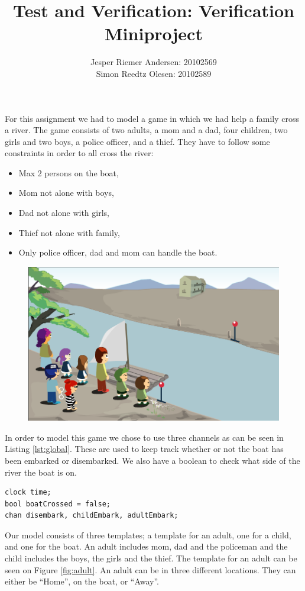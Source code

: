\documentclass[a4paper,12pt]{article}
\title{Test and Verification: Verification Miniproject}
\author{Jesper Riemer Andersen: 20102569\\Simon Reedtz Olesen: 20102589}
\begin{document}
\maketitle

For this assignment we had to model a game in which we had help a family cross a river. The game consists of two adults, a mom and a dad, four children, two girls and two boys, a police officer, and a thief. They have to follow some constraints in order to all cross the river:

\begin{itemize}[noitemsep]
\item Max 2 persons on the boat,
\item Mom not alone with boys,
\item Dad not alone with girls,
\item Thief not alone with family,
\item Only police officer, dad and mom can handle the boat.
\end{itemize}


\begin{figure}[H]
\centering
\includegraphics[width=0.8\linewidth]{Crossing_The_River.png}
\end{figure}

\newpage

In order to model this game we chose to use three channels as can be seen in Listing \ref{lst:global}. These are used to keep track whether or not the boat has been embarked or disembarked. We also have a boolean to check what side of the river the boat is on.

\begin{lstlisting}[caption={Global varialbles},label={lst:global}]
clock time;
bool boatCrossed = false;
chan disembark, childEmbark, adultEmbark;
\end{lstlisting}

Our model consists of three templates; a template for an adult, one for a child, and one for the boat. An adult includes mom, dad and the policeman and the child includes the boys, the girls and the thief. The template for an adult can be seen on Figure \ref{fig:adult}. An adult can be in three different locations. They can either be ``Home'', on the boat, or ``Away''. 
\end{document}
